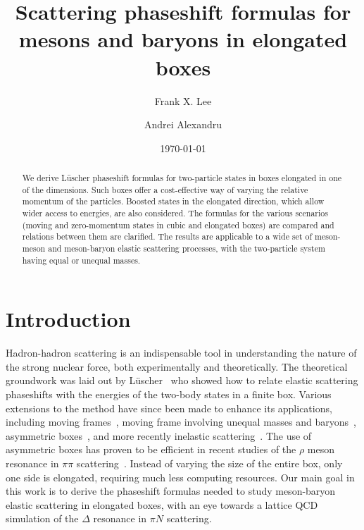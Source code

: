 \documentclass[aps,prd,reprint,showpacs,floatfix,longbibliography,,superscriptaddress]{revtex4-1}
\begin{document}
\title{Scattering phaseshift formulas for mesons and baryons in elongated boxes}
\author{Frank X. Lee}
\author{Andrei Alexandru}
\date{\today}

\begin{abstract}
We derive L\"{u}scher phaseshift formulas for two-particle states in boxes elongated in one of the dimensions. 
Such boxes offer a cost-effective way of varying the relative momentum of the particles. 
Boosted states in the elongated direction, which allow wider access to energies, are also considered. 
The formulas for the various scenarios 
(moving and zero-momentum states in cubic and elongated boxes) are compared 
and relations between them are clarified.
The results are applicable to a wide set of meson-meson and meson-baryon elastic scattering processes, with the two-particle system having equal or unequal masses.
\end{abstract} 


\maketitle


\section{Introduction}
Hadron-hadron scattering is an indispensable  tool in understanding the nature of the strong nuclear force, 
both experimentally and theoretically.
The theoretical groundwork was laid out by L\"{u}scher~\cite{Luscher:1990ux} who 
showed how to relate elastic scattering phaseshifts with the energies of the two-body states in a finite box. 
Various extensions to the method have since been made to enhance its applications, 
including moving frames~\cite{Rummukainen:1995vs}, 
moving frame involving unequal masses and baryons~\cite{Fu:2011xz,Leskovec:2012gb,Gockeler:2012yj},
asymmetric boxes~\cite{Feng:2004ua}, and more recently inelastic scattering~\cite{Li:2012bi,Briceno:2014oea}.
The use of asymmetric boxes has proven to be efficient in recent studies of the $\rho$ meson 
resonance in $\pi\pi$ scattering~\cite{Guo:2016zos,Pelissier:2012pi}.
Instead of varying the size of the entire box, only one side is elongated, requiring much less computing resources.
Our main goal in this work is to derive the phaseshift formulas needed to study meson-baryon elastic  scattering in elongated boxes, 
with an eye towards a lattice QCD simulation of  the $\Delta$ resonance in $\pi N$ scattering.
\end{document}
